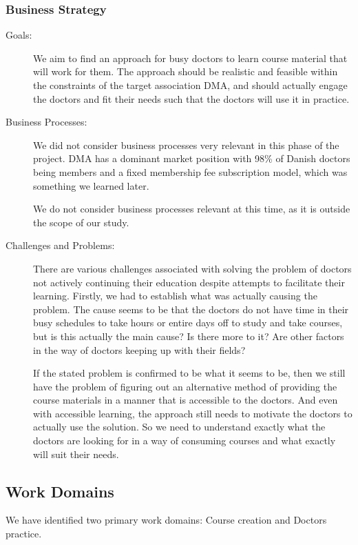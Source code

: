 \subsubsection{Business Strategy}
\begin{description}
\item[Goals:] We aim to find an approach for busy doctors to learn course material that will work for them. The approach should be realistic and feasible within the constraints of the target association DMA, and should actually engage the doctors and fit their needs such that the doctors will use it in practice.
\item[Business Processes:] We did not consider business processes very relevant in this phase of the project. DMA has a dominant market position with 98\% of Danish doctors being members and a fixed membership fee subscription model, which was something we learned later.

We do not consider business processes relevant at this time, as it is outside the scope of our study.
\item[Challenges and Problems:] There are various challenges associated with solving the problem of doctors not actively continuing their education despite attempts to facilitate their learning. Firstly, we had to establish what was actually causing the problem. The cause seems to be that the doctors do not have time in their busy schedules to take hours or entire days off to study and take courses, but is this actually the main cause? Is there more to it? Are other factors in the way of doctors keeping up with their fields?

If the stated problem is confirmed to be what it seems to be, then we still have the problem of figuring out an alternative method of providing the course materials in a manner that is accessible to the doctors. And even with accessible learning, the approach still needs to motivate the doctors to actually use the solution. So we need to understand exactly what the doctors are looking for in a way of consuming courses and what exactly will suit their needs.
\end{description}

\subsection{Work Domains}
We have identified two primary work domains: Course creation and Doctors practice.

